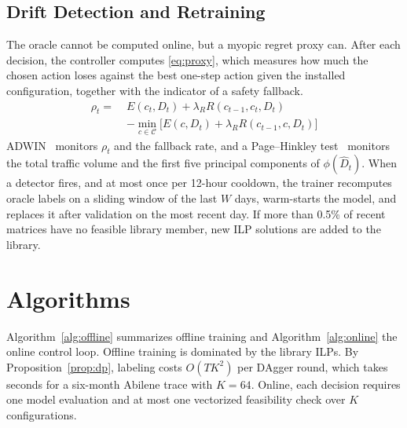 \documentclass[conference]{IEEEtran}
\begin{document}
\subsection{Drift Detection and Retraining}\label{sec:drift}

The oracle cannot be computed online, but a myopic regret proxy can. After each decision, the controller computes \eqref{eq:proxy}, which measures how much the chosen action loses against the best one-step action given the installed configuration, together with the indicator of a safety fallback.
\begin{equation}\label{eq:proxy}
\begin{split}\rho_t=\;&E(c_t,D_t)+\lambda_R R(c_{t-1},c_t,D_t)\\
&-\min_{c\in\mathcal{C}}\Big[E(c,D_t)+\lambda_R R(c_{t-1},c,D_t)\Big]\end{split}
\end{equation}
ADWIN~\cite{bifet2007adwin} monitors $\rho_t$ and the fallback rate, and a Page--Hinkley test~\cite{page1954cusum} monitors the total traffic volume and the first five principal components of $\phi(\hat{D}_t)$. When a detector fires, and at most once per 12-hour cooldown, the trainer recomputes oracle labels on a sliding window of the last $W$ days, warm-starts the model, and replaces it after validation on the most recent day. If more than 0.5\% of recent matrices have no feasible library member, new ILP solutions are added to the library.

\section{Algorithms}\label{sec:algorithms}

Algorithm~\ref{alg:offline} summarizes offline training and Algorithm~\ref{alg:online} the online control loop. Offline training is dominated by the library ILPs. By Proposition~\ref{prop:dp}, labeling costs $O(TK^2)$ per DAgger round, which takes seconds for a six-month Abilene trace with $K=64$. Online, each decision requires one model evaluation and at most one vectorized feasibility check over $K$ configurations.
\end{document}
